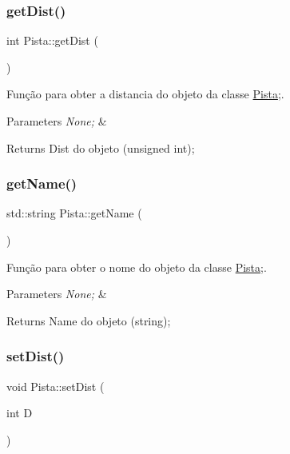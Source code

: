 \subsubsection{\texorpdfstring{get\+Dist()}{getDist()}}
{\footnotesize\ttfamily int Pista\+::get\+Dist (\begin{DoxyParamCaption}{ }\end{DoxyParamCaption})}



Função para obter a distancia do objeto da classe \mbox{\hyperlink{class_pista}{Pista}};. 


\begin{DoxyParams}{Parameters}
{\em None;} & \\
\hline
\end{DoxyParams}
\begin{DoxyReturn}{Returns}
Dist do objeto (unsigned int); 
\end{DoxyReturn}
\mbox{\label{class_pista_a2d9890351396ff2d9bc6b0e020279a80}} 
\subsubsection{\texorpdfstring{get\+Name()}{getName()}}
{\footnotesize\ttfamily std\+::string Pista\+::get\+Name (\begin{DoxyParamCaption}{ }\end{DoxyParamCaption})}



Função para obter o nome do objeto da classe \mbox{\hyperlink{class_pista}{Pista}};. 


\begin{DoxyParams}{Parameters}
{\em None;} & \\
\hline
\end{DoxyParams}
\begin{DoxyReturn}{Returns}
Name do objeto (string); 
\end{DoxyReturn}
\mbox{\label{class_pista_add070183d3928d180ce20446d7c0894a}} 
\subsubsection{\texorpdfstring{set\+Dist()}{setDist()}}
{\footnotesize\ttfamily void Pista\+::set\+Dist (\begin{DoxyParamCaption}\item[{int}]{D }\end{DoxyParamCaption})}



